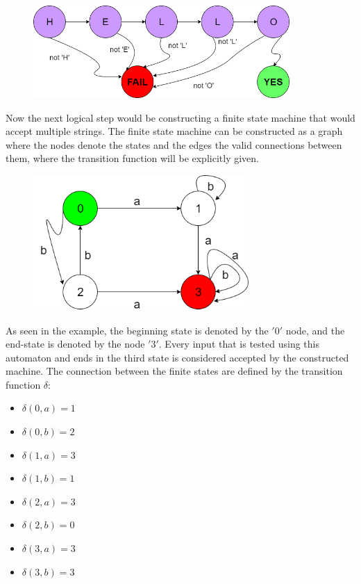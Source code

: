 \documentclass[letterpaper]{article}
\begin{document}
\begin{figure} [h!]
\centering
\includegraphics[width=0.87\textwidth]{pngOfDiagrams/finiteautomatasimple.png}
\end{figure}

Now the next logical step would be constructing a finite state machine that would accept multiple strings. The finite state machine can be constructed as a graph where the nodes denote the states and the edges the valid connections between them, where the transition function will be explicitly given.

\begin{figure} [h!]
\centering
\includegraphics[width=0.73\textwidth]{pngOfDiagrams/finiteautomatacomplex.png}
\end{figure}


As seen in the example, the beginning state is denoted by the $'0'$ node, and the end-state is denoted by the node $'3'$. Every input that is tested using this automaton and ends in the third state is considered accepted by the constructed machine. The connection between the finite states are defined by the transition function $\delta$:

\begin{itemize}
    \item $\delta (0, a) = 1$
    \item $\delta (0, b) = 2$
    \item $\delta (1, a) = 3$
    \item $\delta (1, b) = 1$
    \item $\delta (2, a) = 3$
    \item $\delta (2, b) = 0$
    \item $\delta (3, a) = 3$
    \item $\delta (3, b) = 3$
\end{itemize}
\end{document}

